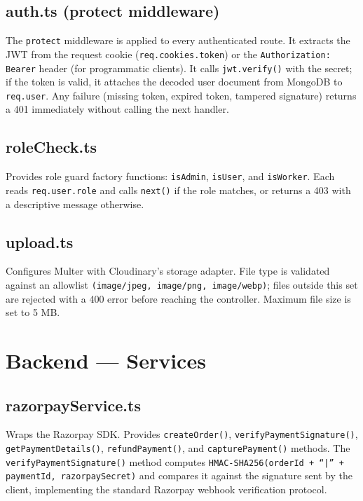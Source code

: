 \documentclass[12pt,a4paper]{report}
\begin{document}
\subsection{auth.ts (protect middleware)}

The \texttt{protect} middleware is applied to every authenticated route. It extracts the JWT from the request cookie (\texttt{req.cookies.token}) or the \texttt{Authorization: Bearer} header (for programmatic clients). It calls \texttt{jwt.verify()} with the secret; if the token is valid, it attaches the decoded user document from MongoDB to \texttt{req.user}. Any failure (missing token, expired token, tampered signature) returns a 401 immediately without calling the next handler.

\subsection{roleCheck.ts}

Provides role guard factory functions: \texttt{isAdmin}, \texttt{isUser}, and \texttt{isWorker}. Each reads \texttt{req.user.role} and calls \texttt{next()} if the role matches, or returns a 403 with a descriptive message otherwise.

\subsection{upload.ts}

Configures Multer with Cloudinary's storage adapter. File type is validated against an allowlist \texttt{(image/jpeg, image/png, image/webp)}; files outside this set are rejected with a 400 error before reaching the controller. Maximum file size is set to 5 MB.

\section{Backend — Services}

\subsection{razorpayService.ts}

Wraps the Razorpay SDK. Provides \texttt{createOrder()}, \texttt{verifyPaymentSignature()}, \texttt{getPaymentDetails()}, \texttt{refundPayment()}, and \texttt{capturePayment()} methods. The \texttt{verifyPaymentSignature()} method computes \texttt{HMAC-SHA256(orderId + ``|'' + paymentId, razorpaySecret)} and compares it against the signature sent by the client, implementing the standard Razorpay webhook verification protocol.
\end{document}
